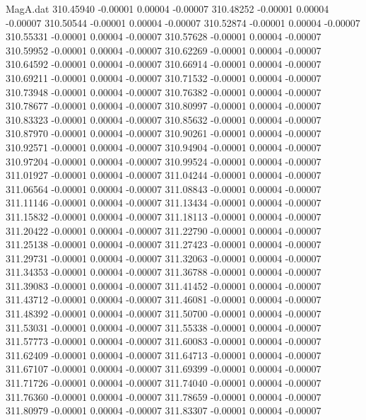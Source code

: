 \begin{filecontents}{MagA.dat}
 310.45940   -0.00001    0.00004   -0.00007
 310.48252   -0.00001    0.00004   -0.00007
 310.50544   -0.00001    0.00004   -0.00007
 310.52874   -0.00001    0.00004   -0.00007
 310.55331   -0.00001    0.00004   -0.00007
 310.57628   -0.00001    0.00004   -0.00007
 310.59952   -0.00001    0.00004   -0.00007
 310.62269   -0.00001    0.00004   -0.00007
 310.64592   -0.00001    0.00004   -0.00007
 310.66914   -0.00001    0.00004   -0.00007
 310.69211   -0.00001    0.00004   -0.00007
 310.71532   -0.00001    0.00004   -0.00007
 310.73948   -0.00001    0.00004   -0.00007
 310.76382   -0.00001    0.00004   -0.00007
 310.78677   -0.00001    0.00004   -0.00007
 310.80997   -0.00001    0.00004   -0.00007
 310.83323   -0.00001    0.00004   -0.00007
 310.85632   -0.00001    0.00004   -0.00007
 310.87970   -0.00001    0.00004   -0.00007
 310.90261   -0.00001    0.00004   -0.00007
 310.92571   -0.00001    0.00004   -0.00007
 310.94904   -0.00001    0.00004   -0.00007
 310.97204   -0.00001    0.00004   -0.00007
 310.99524   -0.00001    0.00004   -0.00007
 311.01927   -0.00001    0.00004   -0.00007
 311.04244   -0.00001    0.00004   -0.00007
 311.06564   -0.00001    0.00004   -0.00007
 311.08843   -0.00001    0.00004   -0.00007
 311.11146   -0.00001    0.00004   -0.00007
 311.13434   -0.00001    0.00004   -0.00007
 311.15832   -0.00001    0.00004   -0.00007
 311.18113   -0.00001    0.00004   -0.00007
 311.20422   -0.00001    0.00004   -0.00007
 311.22790   -0.00001    0.00004   -0.00007
 311.25138   -0.00001    0.00004   -0.00007
 311.27423   -0.00001    0.00004   -0.00007
 311.29731   -0.00001    0.00004   -0.00007
 311.32063   -0.00001    0.00004   -0.00007
 311.34353   -0.00001    0.00004   -0.00007
 311.36788   -0.00001    0.00004   -0.00007
 311.39083   -0.00001    0.00004   -0.00007
 311.41452   -0.00001    0.00004   -0.00007
 311.43712   -0.00001    0.00004   -0.00007
 311.46081   -0.00001    0.00004   -0.00007
 311.48392   -0.00001    0.00004   -0.00007
 311.50700   -0.00001    0.00004   -0.00007
 311.53031   -0.00001    0.00004   -0.00007
 311.55338   -0.00001    0.00004   -0.00007
 311.57773   -0.00001    0.00004   -0.00007
 311.60083   -0.00001    0.00004   -0.00007
 311.62409   -0.00001    0.00004   -0.00007
 311.64713   -0.00001    0.00004   -0.00007
 311.67107   -0.00001    0.00004   -0.00007
 311.69399   -0.00001    0.00004   -0.00007
 311.71726   -0.00001    0.00004   -0.00007
 311.74040   -0.00001    0.00004   -0.00007
 311.76360   -0.00001    0.00004   -0.00007
 311.78659   -0.00001    0.00004   -0.00007
 311.80979   -0.00001    0.00004   -0.00007
 311.83307   -0.00001    0.00004   -0.00007

\end{filecontents}
